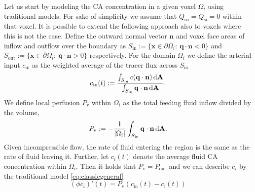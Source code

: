 \documentclass[final,5p,times,twocolumn]{elsarticle}
\begin{document}
	Let us start by modeling the CA concentration in a given voxel $\Omega_i$ using traditional models.
	For sake of simplicity we assume that $Q_{\mathrm{so}} = Q_{\mathrm{si}} = 0$ within that voxel.
	It is possible to extend the following approach also to voxels where this is not the case.
	Define the outward normal vector $\mathbf{n}$ and voxel face areas of inflow and outflow over the boundary as $S_{\mathrm{in}} := \{ \mathbf{x} \in \partial \Omega_i: \ \mathbf{q} \cdot \mathbf{n} < 0 \}$ and $S_{\mathrm{out}}:= \{ \mathbf{x} \in \partial \Omega_i: \ \mathbf{q} \cdot \mathbf{n} > 0 \}$ respectively.
	For the domain $\Omega_i$ we define the arterial input $c_{\mathrm{in}}$ as the weighted average of the tracer flux across $S_{\mathrm{in}}$
	\begin{equation}\label{eq:cin}
	 	c_{\mathrm{in}}(t):= \frac{\int_{S_{\mathrm{in}}}c (\mathbf{q} \cdot \mathbf{n}) \,\mathrm{d} \mathbf{A}}{\int_{S_{\mathrm{in}}} \mathbf{q} \cdot \mathbf{n} \,\mathrm{d} \mathbf{A}}.
	\end{equation}
	We define local perfusion $P_{\mathrm{v}}$ within $\Omega_i$ as the total feeding fluid inflow divided by the volume,
	\begin{equation}\label{eq:perflocal}
		P_{\mathrm{v}} :=-\frac{1}{|\Omega_i|}\int_{S_{\mathrm{in}}} \mathbf{q} \cdot \mathbf{n} \,\mathrm{d} \mathbf{A}.
	\end{equation}
	Given incompressible flow, the rate of fluid entering the region is the same as the rate of fluid leaving it. 
	Further, let $c_i(t)$ denote the average fluid CA concentration within $\Omega_i$.
	Then it holds that $P_{\mathrm{v}}=P_{\mathrm{out}}$ and we can describe $c_i$ by the traditional model \eqref{eq:classicgeneral}
	\begin{equation}\label{eq:singlevoxel}
		(\phi c_i)'(t)  = P_{\mathrm{v}} (c_\mathrm{in}(t)  - c_\mathrm{i}(t))
	\end{equation}
\end{document}
